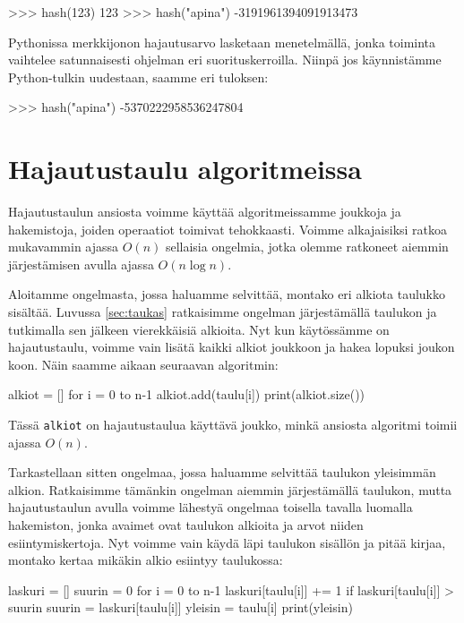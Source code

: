 \begin{code}
>>> hash(123)
123
>>> hash("apina")
-3191961394091913473
\end{code}

Pythonissa merkkijonon hajautusarvo lasketaan menetelmällä,
jonka toiminta vaihtelee satunnaisesti ohjelman eri suorituskerroilla.
Niinpä jos käyn\-nistämme Python-tulkin uudestaan, saamme eri tuloksen:

\begin{code}
>>> hash("apina")
-5370222958536247804
\end{code}

\section{Hajautustaulu algoritmeissa}

Hajautustaulun ansiosta voimme käyttää algoritmeissamme
joukkoja ja hakemistoja, joiden operaatiot toimivat tehokkaasti.
Voimme alkajaisiksi ratkoa mukavammin ajassa $O(n)$ sellaisia ongelmia,
jotka olemme ratkoneet aiemmin järjestämisen avulla ajassa $O(n \log n)$.

Aloitamme ongelmasta, jossa haluamme selvittää,
montako eri alkiota taulukko sisältää.
Luvussa \ref{sec:taukas} ratkaisimme ongelman
järjestämällä taulukon ja tutkimalla sen jälkeen
vierekkäisiä alkioita.
Nyt kun käytös\-sämme on hajautustaulu, voimme vain lisätä
kaikki alkiot joukkoon ja hakea lopuksi joukon koon.
Näin saamme aikaan seuraavan algoritmin:

\begin{code}
alkiot = []
for i = 0 to n-1
    alkiot.add(taulu[i])
print(alkiot.size())
\end{code}

Tässä \texttt{alkiot} on hajautustaulua käyttävä joukko,
minkä ansiosta algoritmi toimii ajassa $O(n)$.

Tarkastellaan sitten ongelmaa, jossa haluamme selvittää
taulukon yleisimmän alkion.
Ratkaisimme tämänkin ongelman aiemmin
järjestä\-mällä taulukon, mutta
hajautustaulun avulla voimme lähestyä ongelmaa
toisella tavalla luomalla hakemiston,
jonka avaimet ovat taulukon alkioita ja arvot niiden
esiintymiskertoja.
Nyt voimme vain käydä läpi taulukon sisällön ja
pitää kirjaa, montako kertaa mikäkin alkio esiintyy taulukossa:

\begin{code}
laskuri = []
suurin = 0
for i = 0 to n-1
    laskuri[taulu[i]] += 1
    if laskuri[taulu[i]] > suurin
        suurin = laskuri[taulu[i]]
        yleisin = taulu[i]
print(yleisin)
\end{code}

